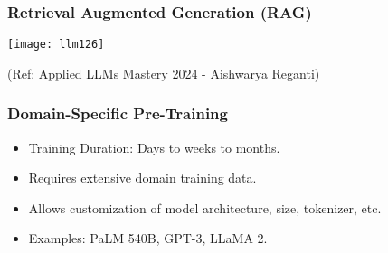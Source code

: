 \begin{frame}[fragile]\frametitle{Retrieval Augmented Generation (RAG)}

\begin{center}
\texttt{[image: llm126]}
\end{center}				

{\tiny (Ref: Applied LLMs Mastery 2024 - Aishwarya Reganti)}

\end{frame}




\begin{frame}[fragile]\frametitle{Domain-Specific Pre-Training}

      \begin{itemize}
        \item Training Duration: Days to weeks to months.
        \item Requires extensive domain training data.
        \item Allows customization of model architecture, size, tokenizer, etc.
        \item Examples: PaLM 540B, GPT-3, LLaMA 2.
      \end{itemize}

\end{frame}



